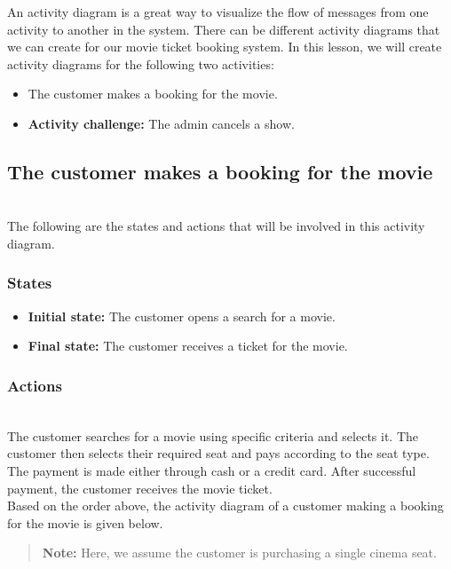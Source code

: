 

An activity diagram is a great way to visualize the flow of messages from one activity to another in the system. There can be different activity diagrams that we can create for our movie ticket booking system. In this lesson, we will create activity diagrams for the following two activities:

\begin{itemize}
\item
\protect{}\label{Sxo-A9j6UjHliGvs06ZnY}
The customer makes a booking for the movie.
\item
\protect{}\label{ZrF2WGngDeqymvqJT4Wc_}
\textbf{Activity challenge:} The admin cancels a show.
\end{itemize}

\subsection{The customer makes a booking for the movie}\label{b97MP6UHJNsTAhQksTikt}
\\
The following are the states and actions that will be involved in this activity diagram.

\subsubsection{States}\label{85bEWEh9TMDHiHaAUWYR8}

\begin{itemize}
\item
\protect{}\label{bOZBbAzNwPjOHz3g09QTh}
\textbf{Initial state:} The customer opens a search for a movie.
\item
\protect{}\label{6MeBSZpNBZuCVqyL40LUi}
\textbf{Final state:} The customer receives a ticket for the movie.
\end{itemize}

\subsubsection{Actions}\label{TUTlraPZcIU0Gv7i6onjm}
\\
The customer searches for a movie using specific criteria and selects it. The customer then selects their required seat and pays according to the seat type. The payment is made either through cash or a credit card. After successful payment, the customer receives the movie ticket.
\\
Based on the order above, the activity diagram of a customer making a booking for the movie is given below.
\begin{quote}
\textbf{Note:} Here, we assume the customer is purchasing a single cinema seat.
\end{quote}


